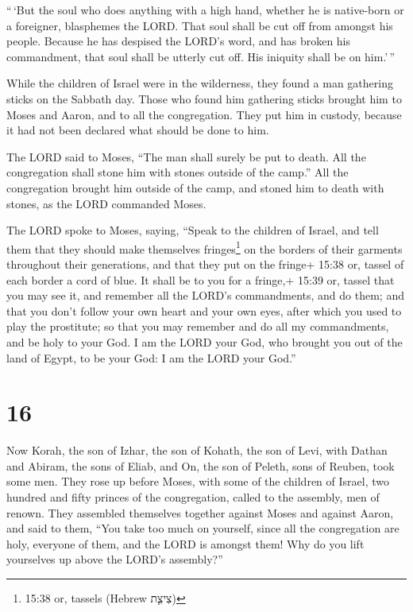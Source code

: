  ``\,`But the soul who does anything with a high hand,
whether he is native-born or a foreigner, blasphemes the LORD. That soul
shall be cut off from amongst his people.  Because he has
despised the LORD's word, and has broken his commandment, that soul
shall be utterly cut off. His iniquity shall be on him.'\,''

 While the children of Israel were in the wilderness, they
found a man gathering sticks on the Sabbath day.  Those who
found him gathering sticks brought him to Moses and Aaron, and to all
the congregation.  They put him in custody, because it had
not been declared what should be done to him.

 The LORD said to Moses, ``The man shall surely be put to
death. All the congregation shall stone him with stones outside of the
camp.''  All the congregation brought him outside of the
camp, and stoned him to death with stones, as the LORD commanded Moses.

 The LORD spoke to Moses, saying,  ``Speak to
the children of Israel, and tell them that they should make themselves
fringes\footnote{15:38 or, tassels (Hebrew צִיצִ֛ת)} on the borders of
their garments throughout their generations, and that they put on the
fringe+ 15:38 or, tassel of each border a cord of blue.  It
shall be to you for a fringe,+ 15:39 or, tassel that you may see it, and
remember all the LORD's commandments, and do them; and that you don't
follow your own heart and your own eyes, after which you used to play
the prostitute;  so that you may remember and do all my
commandments, and be holy to your God.  I am the LORD your
God, who brought you out of the land of Egypt, to be your God: I am the
LORD your God.''

\hypertarget{section-15}{%
\section{16}\label{section-15}}

 Now Korah, the son of Izhar, the son of Kohath, the son of
Levi, with Dathan and Abiram, the sons of Eliab, and On, the son of
Peleth, sons of Reuben, took some men.  They rose up before
Moses, with some of the children of Israel, two hundred and fifty
princes of the congregation, called to the assembly, men of renown.
 They assembled themselves together against Moses and
against Aaron, and said to them, ``You take too much on yourself, since
all the congregation are holy, everyone of them, and the LORD is amongst
them! Why do you lift yourselves up above the LORD's assembly?''

